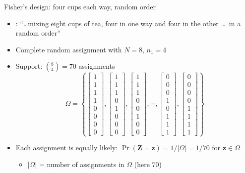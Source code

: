 \documentclass[table, xcolor = {dvipsnames}, 9pt]{beamer}
\theoremstyle{plain}
\begin{document}
\begin{frame}{Fisher's design: four cups each way, random order}
\vfill
\begin{itemize} \vfill
\item \citet[][p.~13]{fisher1935a}: ``\ldots mixing eight cups of tea, four in one way and four in the other \ldots\ in a random order'' \vfill
\item Complete random assignment with $N = 8$, $n_1 = 4$ \vfill 
\item[] Support: $\binom{8}{4} = 70$ assignments \vfill
\begin{equation*}
\Omega = \left\{
\begin{bmatrix} 1 \\ 1 \\ 1 \\ 1 \\ 0 \\ 0 \\ 0 \\ 0 \end{bmatrix},
\begin{bmatrix} 1 \\ 1 \\ 1 \\ 0 \\ 1 \\ 0 \\ 0 \\ 0 \end{bmatrix},
\begin{bmatrix} 1 \\ 1 \\ 1 \\ 0 \\ 0 \\ 1 \\ 0 \\ 0 \end{bmatrix},
\cdots ,
\begin{bmatrix} 0 \\ 0 \\ 0 \\ 1 \\ 0 \\ 1 \\ 1 \\ 1 \end{bmatrix},
\begin{bmatrix} 0 \\ 0 \\ 0 \\ 0 \\ 1 \\ 1 \\ 1 \\ 1 \end{bmatrix}
\right\}
\end{equation*} \vfill
\item Each assignment is equally likely: $\Pr(\bm{Z} = \bm{z}) = 1/\lvert \Omega \rvert = 1/70$ for $\bm{z} \in \Omega$ \vfill
\begin{itemize} \vfill
\item $\lvert \Omega \rvert$ = number of assignments in $\Omega$ (here $70$) \vfill
\end{itemize} \vfill
\end{itemize} \vfill
\end{frame}
\end{document}
